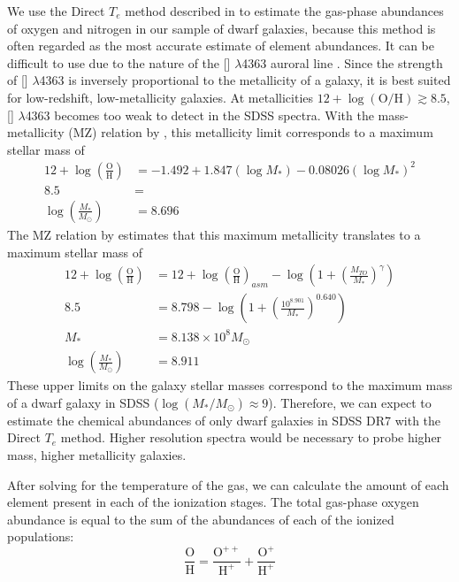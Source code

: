 We use the Direct $T_e$ method described in \cite{Izotov06} to estimate the 
gas-phase abundances of oxygen and nitrogen in our sample of dwarf galaxies, 
because this method is often regarded as the most accurate estimate of element 
abundances.  It can be difficult to use due to the nature of the [] 
$\lambda$4363 auroral line \citep[for a more detailed discussion, see][]
{Douglass17a}.  Since the strength of [] $\lambda$4363 is inversely 
proportional to the metallicity of a galaxy, it is best suited for low-redshift, 
low-metallicity galaxies.  At metallicities 
$12 + \log (\text{O}/\text{H}) \gtrsim 8.5$, [] $\lambda$4363 becomes 
too weak to detect in the SDSS spectra.  With the mass-metallicity (MZ) relation 
by \cite{Tremonti04}, this metallicity limit corresponds to a maximum stellar 
mass of
\begin{align*}
    12 + \log \left( \frac{\text{O}}{\text{H}} \right) &= -1.492 + 1.847(\log M_*) - 0.08026(\log M_*)^2\\
    8.5 &= \\
    \log \left( \frac{M_*}{M_\odot} \right) &= 8.696
\end{align*}
The MZ relation by \cite{Andrews13} estimates that this maximum metallicity 
translates to a maximum stellar mass of
\begin{align*}
    12 + \log \left( \frac{\text{O}}{\text{H}} \right) &= 12 + \log \left( \frac{\text{O}}{\text{H}} \right)_{asm} - \log \left( 1 + \left( \frac{M_{TO}}{M_*} \right)^\gamma \right)\\
    8.5 &= 8.798 - \log \left( 1 + \left( \frac{10^{8.901}}{M_*} \right)^{0.640} \right)\\
    M_* &= 8.138\times 10^8 M_\odot\\
    \log \left( \frac{M_*}{M_\odot} \right) &= 8.911
\end{align*}
These upper limits on the galaxy stellar masses correspond to the maximum mass 
of a dwarf galaxy in SDSS ($\log (M_*/M_\odot) \approx 9$).  Therefore, we can 
expect to estimate the chemical abundances of only dwarf galaxies in SDSS DR7 
with the Direct $T_e$ method.  Higher resolution spectra would be necessary to 
probe higher mass, higher metallicity galaxies.

After solving for the temperature of the gas, we can 
calculate the amount of each element present in each of the ionization stages.  
The total gas-phase oxygen abundance is equal to the sum of the abundances of 
each of the ionized populations:
\begin{equation}
	\frac{\text{O}}{\text{H}} = \frac{\text{O}^{++}}{\text{H}^+} + \frac{\text{O}^+}{\text{H}^+}
\end{equation}

